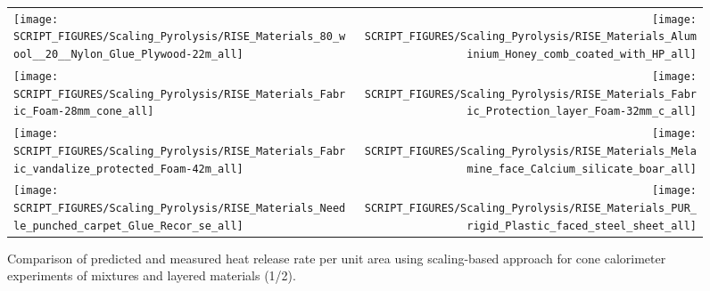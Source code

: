 \begin{figure}[!h]
\begin{tabular*}{\textwidth}{l@{\extracolsep{\fill}}r}
\texttt{[image: SCRIPT\_FIGURES/Scaling\_Pyrolysis/RISE\_Materials\_80\_wool\_\_20\_\_Nylon\_Glue\_Plywood-22m\_all]} &
\texttt{[image: SCRIPT\_FIGURES/Scaling\_Pyrolysis/RISE\_Materials\_Aluminium\_Honey\_comb\_coated\_with\_HP\_all]} \\
\texttt{[image: SCRIPT\_FIGURES/Scaling\_Pyrolysis/RISE\_Materials\_Fabric\_Foam-28mm\_cone\_all]} &
\texttt{[image: SCRIPT\_FIGURES/Scaling\_Pyrolysis/RISE\_Materials\_Fabric\_Protection\_layer\_Foam-32mm\_c\_all]} \\
\texttt{[image: SCRIPT\_FIGURES/Scaling\_Pyrolysis/RISE\_Materials\_Fabric\_vandalize\_protected\_Foam-42m\_all]} &
\texttt{[image: SCRIPT\_FIGURES/Scaling\_Pyrolysis/RISE\_Materials\_Melamine\_face\_Calcium\_silicate\_boar\_all]} \\
\texttt{[image: SCRIPT\_FIGURES/Scaling\_Pyrolysis/RISE\_Materials\_Needle\_punched\_carpet\_Glue\_Recor\_se\_all]} &
\texttt{[image: SCRIPT\_FIGURES/Scaling\_Pyrolysis/RISE\_Materials\_PUR\_rigid\_Plastic\_faced\_steel\_sheet\_all]} \\
\end{tabular*}
\caption[Heat release rate per unit area of RISE materials using scaling model, mixtures and layered materials]
{Comparison of predicted and measured heat release rate per unit area using scaling-based approach for cone calorimeter experiments of mixtures and layered materials (1/2).}
\label{RISE_Materials_mixtures1}
\end{figure}

